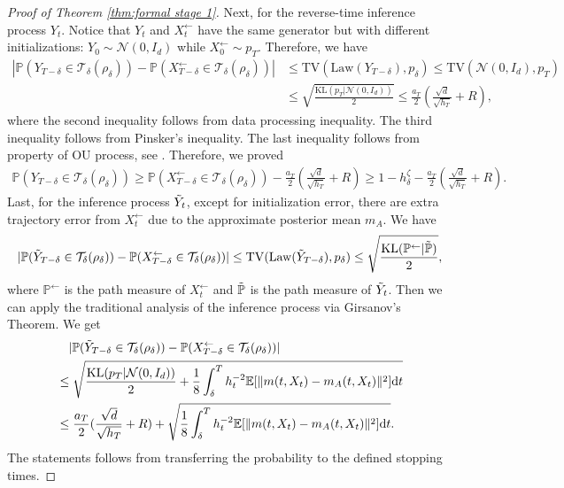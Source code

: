 \documentclass[11pt]{article}
\newcommand{\mb}{\mathbb}
\newcommand{\dee}{\mathrm{d}}
\newcommand{\mc}{\mathcal}
\newcommand{\TV}{\mathrm{TV}}
\newcommand{\KL}{\mathrm{KL}}
\begin{document}
\begin{proof}[Proof of Theorem \ref{thm:formal stage 1}]
Next, for the reverse-time inference process $Y_t$. Notice that $Y_t$ and $X_t^\leftarrow$ have the same generator but with different initializations: $Y_0\sim \mc{N}(0,I_d)$ while $X_0^\leftarrow\sim p_T$. Therefore, we have
\begin{align*}
      |\mb{P}(Y_{T-\delta}\in \mc{T}_\delta(\rho_\delta))- \mb{P}(X_{T-\delta}^\leftarrow\in \mc{T}_\delta(\rho_\delta))| &\le  \TV( \mathrm{Law}(Y_{T-\delta}), p_\delta )\le \TV(\mc{N}(0,I_d), p_T) \\
    &\le \sqrt{\frac{\KL(p_T|\mc{N}(0,I_d))}{2}} \le \frac{a_T}{2}(\frac{\sqrt{d}}{\sqrt{h_T}} + R),
\end{align*}
where the second inequality follows from data processing inequality. The third inequality follows from Pinsker's inequality. The last inequality follows from property of OU process, see \cite[Proposition C.1]{he2024zeroth}. Therefore, we proved
\begin{align*}
    \mb{P}(Y_{T-\delta}\in \mc{T}_\delta(\rho_\delta))\ge \mb{P}(X_{T-\delta}^\leftarrow\in \mc{T}_\delta(\rho_\delta)) - \frac{a_T}{2}(\frac{\sqrt{d}}{\sqrt{h_T}} + R)\ge 1-h_\delta^\zeta - \frac{a_T}{2}(\frac{\sqrt{d}}{\sqrt{h_T}} + R).
\end{align*}
Last, for the inference process $\Tilde{Y}_t$, except for initialization error, there are extra trajectory error from $X_t^\leftarrow$ due to the approximate posterior mean $m_A$. We have
\begin{align*}
    |\mb{P}(\Tilde{Y}_{T-\delta}\in \mc{T}_\delta(\rho_\delta))- \mb{P}(X_{T-\delta}^\leftarrow\in \mc{T}_\delta(\rho_\delta))| \le \TV( \mathrm{Law}(\Tilde{Y}_{T-\delta}), p_\delta )\le \sqrt{\frac{\KL(\mb{P}^\leftarrow|\Tilde{\mb{P}})}{2}},
\end{align*}
where $\mb{P}^\leftarrow$ is the path measure of $X_t^\leftarrow$ and $\Tilde{\mb{P}}$ is the path measure of $\Tilde{Y}_t$. Then we can apply the traditional analysis of the inference process via Girsanov's Theorem. We get 
\begin{align*}
    &\quad |\mb{P}(\Tilde{Y}_{T-\delta}\in \mc{T}_\delta(\rho_\delta))- \mb{P}(X_{T-\delta}^\leftarrow\in \mc{T}_\delta(\rho_\delta))| \\
    &\le \sqrt{\frac{\KL(p_T|\mc{N}(0,I_d))}{2} + \frac{1}{8}\int_\delta^T h_t^{-2}\mb{E}[\| m(t,X_t)-m_A(t,X_t) \|^2] \dee t }\\
    &\le \frac{a_T}{2}(\frac{\sqrt{d}}{\sqrt{h_T}} + R) + \sqrt{\frac{1}{8}\int_\delta^T h_t^{-2}\mb{E}[\| m(t,X_t)-m_A(t,X_t) \|^2] \dee t }.
\end{align*}
The statements follows from transferring the probability to the defined stopping times.
\end{proof}
\end{document}
